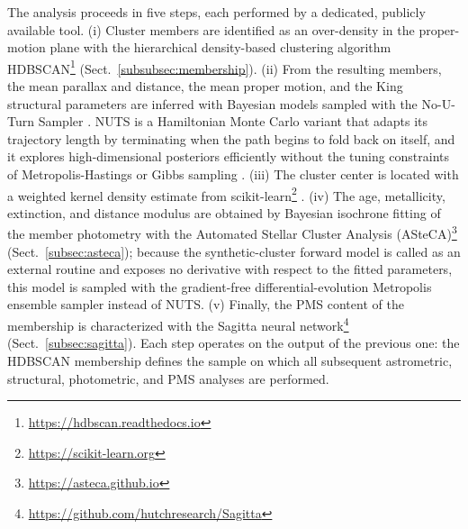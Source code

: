 \documentclass{aa}
\begin{document}
The analysis proceeds in five steps, each performed by a dedicated, publicly available tool\@. (i) Cluster members are identified as an over-density in the proper-motion plane with the hierarchical density-based clustering algorithm HDBSCAN\footnote{\url{https://hdbscan.readthedocs.io}} \citep{10.1007/978-3-642-37456-2_14,McInnes2017} (Sect.~\ref{subsubsec:membership})\@. (ii) From the resulting members, the mean parallax and distance, the mean proper motion, and the King structural parameters are inferred with Bayesian models sampled with the No-U-Turn Sampler \citep[NUTS;][]{2014JMLR...15.1593H}. NUTS is a Hamiltonian Monte Carlo variant that adapts its trajectory length by terminating when the path begins to fold back on itself, and it explores high-dimensional posteriors efficiently without the tuning constraints of Metropolis-Hastings or Gibbs sampling \citep{pymc2023}\@. (iii) The cluster center is located with a weighted kernel density estimate from scikit-learn\footnote{\url{https://scikit-learn.org}} \citep{scikit-learn}\@. (iv) The age, metallicity, extinction, and distance modulus are obtained by Bayesian isochrone fitting of the member photometry with the Automated Stellar Cluster Analysis (ASteCA)\footnote{\url{https://asteca.github.io}} \citep{2015A&A...576A...6P} (Sect.~\ref{subsec:asteca}); because the synthetic-cluster forward model is called as an external routine and exposes no derivative with respect to the fitted parameters, this model is sampled with the gradient-free differential-evolution Metropolis ensemble sampler \citep[DEMetropolis;][]{2006S&C....16..239T} instead of NUTS\@. (v) Finally, the PMS content of the membership is characterized with the Sagitta neural network\footnote{\url{https://github.com/hutchresearch/Sagitta}} \citep{2021AJ....162..282M} (Sect.~\ref{subsec:sagitta}). Each step operates on the output of the previous one: the HDBSCAN membership defines the sample on which all subsequent astrometric, structural, photometric, and PMS analyses are performed.
\end{document}
